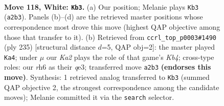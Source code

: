 \documentclass[11pt]{article}
\begin{document}
\begin{figure}[p]\centering
\begin{subfigure}{0.46\textwidth}\centering
\resizebox{\linewidth}{!}{%
\newchessgame
\chessboard[
  setfen={6k1/8/7r/8/1B6/8/K4R2/8 w - - 3 118},
  showmover=false,
  pgfstyle=straightmove, color=movearrow, markmove={a2-b3}
]}
\caption{}
\end{subfigure}\hfill
\begin{subfigure}{0.46\textwidth}\centering
\resizebox{\linewidth}{!}{%
\newchessgame
\chessboard[
  setfen={8/1r6/3K4/1k6/8/4Q3/8/8 b - - 12 118},
  showmover=false,
  pgfstyle=straightmove, color=movearrow, markmove={b5-a4}
]}
\caption{}
\end{subfigure}
\\[4pt]

\caption{\textbf{Move 118, White: \texttt{Kb3}.} (a) Our position; Melanie plays \texttt{Kb3} (\texttt{a2b3}). Panels (b)--(d) are the retrieved master positions whose correspondence most drove this move (highest QAP objective among those that transfer to it). (b) Retrieved from \texttt{ccrl\_top\_p0003\#1490} (ply 235) [structural distance $d$=5, QAP obj=2]: the master played \texttt{Ka4}; under $\mu$ our \emph{Ka2} plays the role of that game's \emph{Kb4}; cross-type roles: our \emph{r}h6 as their \emph{q}e3; transferred move \texttt{a2b3} \textbf{(endorses this move)}. Synthesis: 1 retrieved analog transferred to \texttt{Kb3} (summed QAP objective 2, the strongest correspondence among the candidate moves); Melanie committed it via the \texttt{search} selector.}
\label{fig:thought-m234}
\end{figure}

\clearpage
\end{document}
